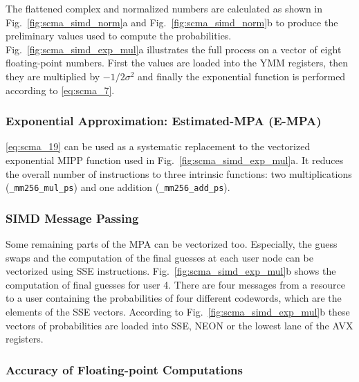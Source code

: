 The flattened complex and normalized numbers are calculated as shown in
Fig.~\ref{fig:scma_simd_norm}a and Fig.~\ref{fig:scma_simd_norm}b to produce the
preliminary values used to compute the probabilities.
Fig.~\ref{fig:scma_simd_exp_mul}a illustrates the full process on a vector of
eight floating-point numbers. First the values are loaded into the YMM
registers, then they are multiplied by $-1/2\sigma^2$ and finally the
exponential function is performed according to \eqref{eq:scma_7}.

\subsubsection{Exponential Approximation: Estimated-MPA (E-MPA)}

\eqref{eq:scma_19} can be used as a systematic replacement to the vectorized
exponential MIPP function used in Fig.~\ref{fig:scma_simd_exp_mul}a. It reduces
the overall number of instructions to three intrinsic functions: two
multiplications (\verb|_mm256_mul_ps|) and one addition (\verb|_mm256_add_ps|).

\subsubsection{SIMD Message Passing}

Some remaining parts of the MPA can be vectorized too. Especially, the guess
swaps and the computation of the final guesses at each user node can be
vectorized using SSE instructions. Fig.~\ref{fig:scma_simd_exp_mul}b shows the
computation of final guesses for user 4. There are four messages from a resource
to a user containing the probabilities of four different codewords, which are
the elements of the SSE vectors. According to Fig.~\ref{fig:scma_simd_exp_mul}b
these vectors of probabilities are loaded into SSE, NEON or the lowest lane of
the AVX registers.

\subsubsection{Accuracy of Floating-point Computations}
\label{sec:opt_scma_float}

